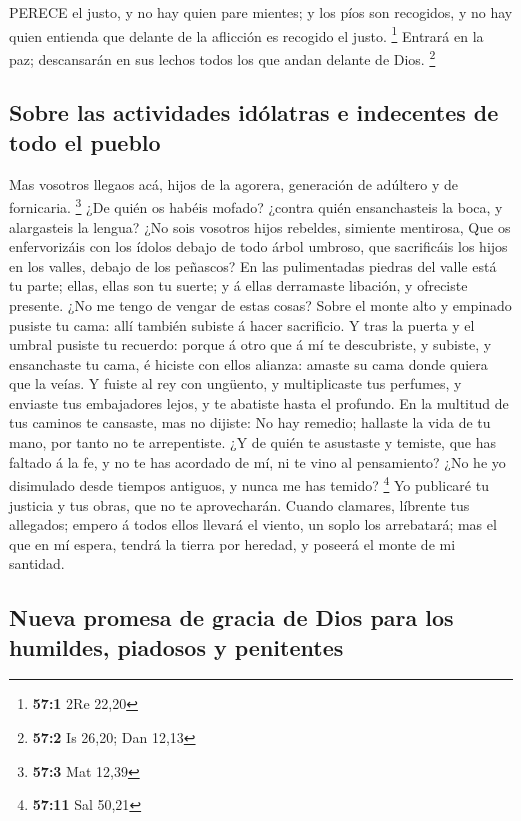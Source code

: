  PERECE el justo, y no hay quien pare mientes; y los píos
son recogidos, y no hay quien entienda que delante de la aflicción es
recogido el justo. \footnote{\textbf{57:1} 2Re 22,20} 
Entrará en la paz; descansarán en sus lechos todos los que andan delante
de Dios. \footnote{\textbf{57:2} Is 26,20; Dan 12,13}

\hypertarget{sobre-las-actividades-iduxf3latras-e-indecentes-de-todo-el-pueblo}{%
\subsection{Sobre las actividades idólatras e indecentes de todo el
pueblo}\label{sobre-las-actividades-iduxf3latras-e-indecentes-de-todo-el-pueblo}}

 Mas vosotros llegaos acá, hijos de la agorera, generación
de adúltero y de fornicaria. \footnote{\textbf{57:3} Mat 12,39}
 ¿De quién os habéis mofado? ¿contra quién ensanchasteis la
boca, y alargasteis la lengua? ¿No sois vosotros hijos rebeldes,
simiente mentirosa,  Que os enfervorizáis con los ídolos
debajo de todo árbol umbroso, que sacrificáis los hijos en los valles,
debajo de los peñascos?  En las pulimentadas piedras del
valle está tu parte; ellas, ellas son tu suerte; y á ellas derramaste
libación, y ofreciste presente. ¿No me tengo de vengar de estas cosas?
 Sobre el monte alto y empinado pusiste tu cama: allí
también subiste á hacer sacrificio.  Y tras la puerta y el
umbral pusiste tu recuerdo: porque á otro que á mí te descubriste, y
subiste, y ensanchaste tu cama, é hiciste con ellos alianza: amaste su
cama donde quiera que la veías.  Y fuiste al rey con
ungüento, y multiplicaste tus perfumes, y enviaste tus embajadores
lejos, y te abatiste hasta el profundo.  En la multitud de
tus caminos te cansaste, mas no dijiste: No hay remedio; hallaste la
vida de tu mano, por tanto no te arrepentiste.  ¿Y de quién
te asustaste y temiste, que has faltado á la fe, y no te has acordado de
mí, ni te vino al pensamiento? ¿No he yo disimulado desde tiempos
antiguos, y nunca me has temido? \footnote{\textbf{57:11} Sal 50,21}
 Yo publicaré tu justicia y tus obras, que no te
aprovecharán.  Cuando clamares, líbrente tus allegados;
empero á todos ellos llevará el viento, un soplo los arrebatará; mas el
que en mí espera, tendrá la tierra por heredad, y poseerá el monte de mi
santidad.

\hypertarget{nueva-promesa-de-gracia-de-dios-para-los-humildes-piadosos-y-penitentes}{%
\subsection{Nueva promesa de gracia de Dios para los humildes, piadosos
y
penitentes}\label{nueva-promesa-de-gracia-de-dios-para-los-humildes-piadosos-y-penitentes}}

